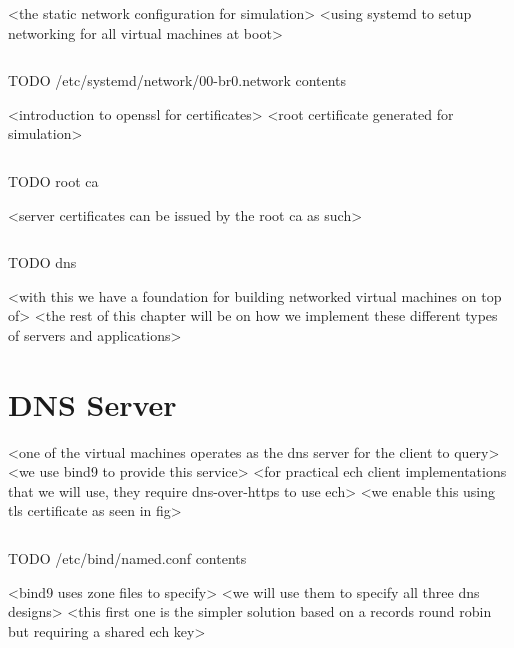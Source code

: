 <the static network configuration for simulation>
<using systemd to setup networking for all virtual machines at boot>

\begin{listing}[ht]
\inputminted{ini}{snippets/br0.ini}
\caption[Static bridge network configuration using systemd]{TODO /etc/systemd/network/00-br0.network contents}
\end{listing}

<introduction to openssl for certificates>
\cite{TODO:openssl}
<root certificate generated for simulation>

\begin{listing}[ht]
\inputminted{bash}{snippets/root.bash}
\caption[Generating a new self-signed root CA X.509 certificate using OpenSSL]{TODO root ca}
\end{listing}

<server certificates can be issued by the root ca as such>

\begin{listing}[ht]
\inputminted{bash}{snippets/dns.bash}
\caption[Signing a new X.509 certificate for ns.example.com using OpenSSL]{TODO dns}
\end{listing}

<with this we have a foundation for building networked virtual machines on top of>
<the rest of this chapter will be on how we implement these different types of servers and applications>










\section{DNS Server}

<one of the virtual machines operates as the dns server for the client to query>
<we use bind9 to provide this service>
\cite{TODO:bind}
<for practical ech client implementations that we will use, they require dns-over-https to use ech>
<we enable this using tls certificate as seen in fig>

\begin{listing}[ht]
\inputminted{bash}{snippets/bind}
\caption[DNS over HTTPS configuration using BIND 9]{TODO /etc/bind/named.conf contents}
\end{listing}

<bind9 uses zone files to specify>
<we will use them to specify all three dns designs>
<this first one is the simpler solution based on a records round robin but requiring a shared ech key>

